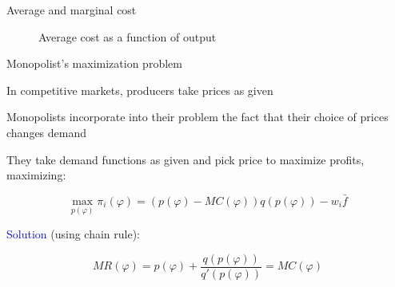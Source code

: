 \documentclass[notes,11pt, aspectratio=169, xcolor=table]{beamer}
\newcommand{\blue}[1]{\textcolor{blue}{#1}}
\newenvironment{wideitemize}{\itemize\addtolength{\itemsep}{10pt}}{\enditemize}
\begin{document}
\begin{frame}{Average and marginal cost}

    \begin{figure}[htp]
        \centering
            \caption{Average cost as a function of output}
        \label{fig: ac}
    \end{figure}    
\end{frame}



\begin{frame}{Monopolist's maximization problem}

\begin{wideitemize}
    \item In competitive markets, producers take prices as given 
    \item Monopolists incorporate into their problem the fact that their choice of prices changes demand
    \item They take demand functions as given and pick price to maximize profits, maximizing:

    \begin{equation*}
        \max_{p(\varphi)} \pi_i(\varphi) = (p(\varphi)-MC(\varphi))q(p(\varphi)) - w_i \bar{f}
    \end{equation*}

    \blue{Solution} (using chain rule):

    \begin{equation*}
        MR(\varphi) = p(\varphi) + \frac{q(p(\varphi))}{q'(p(\varphi))} = MC(\varphi)
    \end{equation*}

\end{wideitemize}
    
\end{frame}
\end{document}
